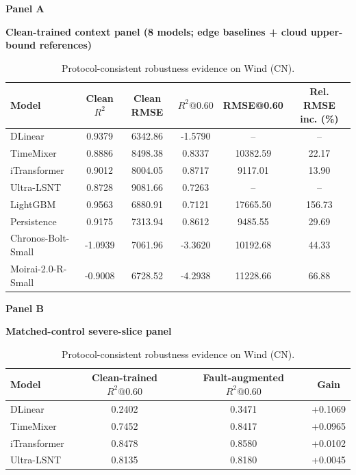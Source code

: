 \documentclass[review,1p,times]{elsarticle}
\newcommand{\aePanelHeading}[2]{%
  \par\vspace{2pt}%
  \noindent\begin{minipage}{\linewidth}
    \centering
    \textbf{#1}\par
    \textbf{#2}\par
  \end{minipage}%
  \par\vspace{2pt}%
}
\begin{document}
\begin{table}[t]
\centering
\caption{Protocol-consistent robustness evidence on Wind (CN).}
\label{tab:table2_comprehensive}
\label{tab:main4_perf_robust_transfer}
\label{tab:main_wind_cn}
\label{tab:master_robustness}
\footnotesize
\setlength{\tabcolsep}{4pt}
\aePanelHeading{Panel A}{Clean-trained context panel (8 models; edge baselines + cloud upper-bound references)}
\begin{tabular*}{\linewidth}{@{\extracolsep{\fill}}lccccc@{}}
\toprule
\textbf{Model} & \textbf{Clean $R^2$} & \textbf{Clean RMSE} & \textbf{$R^2@0.60$} & \textbf{RMSE@0.60} & \textbf{Rel. RMSE inc. (\%)} \\
\midrule
DLinear & 0.9379 & 6342.86 & -1.5790 & -- & -- \\
TimeMixer & 0.8886 & 8498.38 & 0.8337 & 10382.59 & 22.17 \\
iTransformer & 0.9012 & 8004.05 & 0.8717 & 9117.01 & 13.90 \\
Ultra-LSNT & 0.8728 & 9081.66 & 0.7263 & -- & -- \\
LightGBM & 0.9563 & 6880.91 & 0.7121 & 17665.50 & 156.73 \\
Persistence & 0.9175 & 7313.94 & 0.8612 & 9485.55 & 29.69 \\
Chronos-Bolt-Small & -1.0939 & 7061.96 & -3.3620 & 10192.68 & 44.33 \\
Moirai-2.0-R-Small & -0.9008 & 6728.52 & -4.2938 & 11228.66 & 66.88 \\
\bottomrule
\end{tabular*}
\vspace{4pt}
\aePanelHeading{Panel B}{Matched-control severe-slice panel}
\begin{tabular*}{0.92\linewidth}{@{\extracolsep{\fill}}lccc@{}}
\toprule
\textbf{Model} & \textbf{Clean-trained $R^2@0.60$} & \textbf{Fault-augmented $R^2@0.60$} & \textbf{Gain} \\
\midrule
DLinear & 0.2402 & 0.3471 & +0.1069 \\
TimeMixer & 0.7452 & 0.8417 & +0.0965 \\
iTransformer & 0.8478 & 0.8580 & +0.0102 \\
Ultra-LSNT & 0.8135 & 0.8180 & +0.0045 \\
\bottomrule
\end{tabular*}

\end{table}
\end{document}
